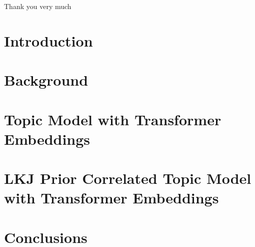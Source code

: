 \documentclass[master,final,11pt]{iscs-thesis}
\date{\today}
\begin{document}
\begin{eabstract}

\end{eabstract}
\begin{jabstract}

\end{jabstract}
\maketitle
\begin{acknowledge}
Thank you very much
\end{acknowledge}
\switchinterim
\switchenglish
\frontmatter %
\tableofcontents %
\listoffigures %
\listoftables %
\listofalgorithms
\mainmatter %
\titlepage
\chapter{Introduction}\label{ch1}



\chapter{Background}\label{ch2}

\chapter{Topic Model with Transformer Embeddings}\label{ch3}



\chapter{LKJ Prior Correlated Topic Model with Transformer Embeddings}\label{ch4}



%
%
%
\chapter{Conclusions}\label{ch6}

\cite{wallach_rethinking_nodate}
%
\end{document}
